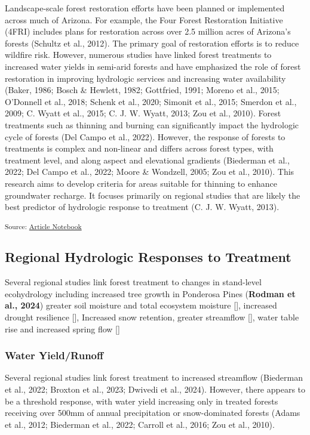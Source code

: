 \documentclass[
]{agujournal2019}
\begin{document}
Landscape-scale forest restoration efforts have been planned or
implemented across much of Arizona. For example, the Four Forest
Restoration Initiative (4FRI) includes plans for restoration across over
2.5 million acres of Arizona's forests (Schultz et al., 2012). The
primary goal of restoration efforts is to reduce wildfire risk. However,
numerous studies have linked forest treatments to increased water yields
in semi-arid forests and have emphasized the role of forest restoration
in improving hydrologic services and increasing water availability
(Baker, 1986; Bosch \& Hewlett, 1982; Gottfried, 1991; Moreno et al.,
2015; O'Donnell et al., 2018; Schenk et al., 2020; Simonit et al., 2015;
Smerdon et al., 2009; C. Wyatt et al., 2015; C. J. W. Wyatt, 2013; Zou
et al., 2010). Forest treatments such as thinning and burning can
significantly impact the hydrologic cycle of forests (Del Campo et al.,
2022). However, the response of forests to treatments is complex and
non-linear and differs across forest types, with treatment level, and
along aspect and elevational gradients (Biederman et al., 2022; Del
Campo et al., 2022; Moore \& Wondzell, 2005; Zou et al., 2010). This
research aims to develop criteria for areas suitable for thinning to
enhance groundwater recharge. It focuses primarily on regional studies
that are likely the best predictor of hydrologic response to treatment
(C. J. W. Wyatt, 2013).

\textsubscript{Source:
\href{https://Ryan3Lima.github.io/ATUR-ForestThinning/index.ipynb.html}{Article
Notebook}}

\subsection{Regional Hydrologic Responses to
Treatment}\label{regional-hydrologic-responses-to-treatment}

Several regional studies link forest treatment to changes in stand-level
ecohydrology including increased tree growth in Ponderosa Pines
(\textbf{Rodman et al., 2024}) greater soil moisture and total ecosystem
moisture {[}{]}, increased drought resilience {[}{]}, Increased snow
retention, greater streamflow {[}{]}, water table rise and increased
spring flow {[}{]}

\subsubsection{Water Yield/Runoff}\label{water-yieldrunoff}

Several regional studies link forest treatment to increased streamflow
(Biederman et al., 2022; Broxton et al., 2023; Dwivedi et al., 2024).
However, there appears to be a threshold response, with water yield
increasing only in treated forests receiving over 500mm of annual
precipitation or snow-dominated forests (Adams et al., 2012; Biederman
et al., 2022; Carroll et al., 2016; Zou et al., 2010).
\end{document}
